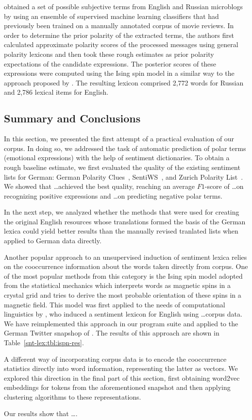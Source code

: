 \citet{Chetviorkin:14} obtained a set of possible subjective terms
from English and Russian microblogs by using an ensemble of supervised
machine learning classifiers that had previously been trained on a
manually annotated corpus of movie reviews.  In order to determine the
prior polarity of the extracted terms, the authors first calculated
approximate polarity scores of the processed messages using general
polarity lexicons and then took these rough estimates as prior
polarity expectations of the candidate expressions.  The posterior
scores of these expressions were computed using the Ising spin model
in a similar way to the approach proposed by \citet{Takamura:05}.  The
resulting lexicon comprised 2,772 words for Russian and 2,786 lexical
items for English.


\subsection{Summary and Conclusions}

In this section, we presented the first attempt of a practical
evaluation of our corpus.  In doing so, we addressed the task of
automatic prediction of polar terms (emotional expressions) with the
help of sentiment dictionaries.  To obtain a rough baseline estimate,
we first evaluated the quality of the existing sentiment lists for
German: German Polarity Clues~\cite{Waltinger:10},
SentiWS~\cite{Remus:10}, and Zurich Polarity List~\cite{Clematide:10}.
We showed that \ldots achieved the best quality, reaching an average
$F1$-score of \ldots on recognizing positive expressions and \ldots on
predicting negative polar terms.

In the next step, we analyzed whether the methods that were used for
creating the original English resources whose translations formed the
basis of the German lexica could yield better results than the
manually revised tranlated lists when applied to German data directly.

Another popular approach to an unsupervised induction of sentiment
lexica relies on the cooccurrence information about the words taken
directly from corpus.  One of the most popular methods from this
category is the Ising spin model adopted from the statistical
mechanics which interprets words as magnetic spins in a crystal grid
and tries to derive the most probable orientation of these spins in a
magnetic field.  This model was first applied to the needs of
computational linguistics by \citet{Takamura:05}, who induced a
sentiment lexicon for English using \ldots corpus data.  We have
reimplemented this approach in our program suite and applied to the
German Twitter snapshop of \citet{Scheffler:14}.  The results of this
approach are shown in Table~\ref{snt-lex:tbl:ispn-res}.

A different way of incorporating corpus data is to encode the
cooccurrence statistics directly into word information, representing
the latter as vectors.  We explored this direction in the final part
of this section, first obtaining word2vec embeddings for tokens from
the aforementioned snapshot and then applying clustering algorithms to
these representations.

Our results show that \ldots.

\newpage
